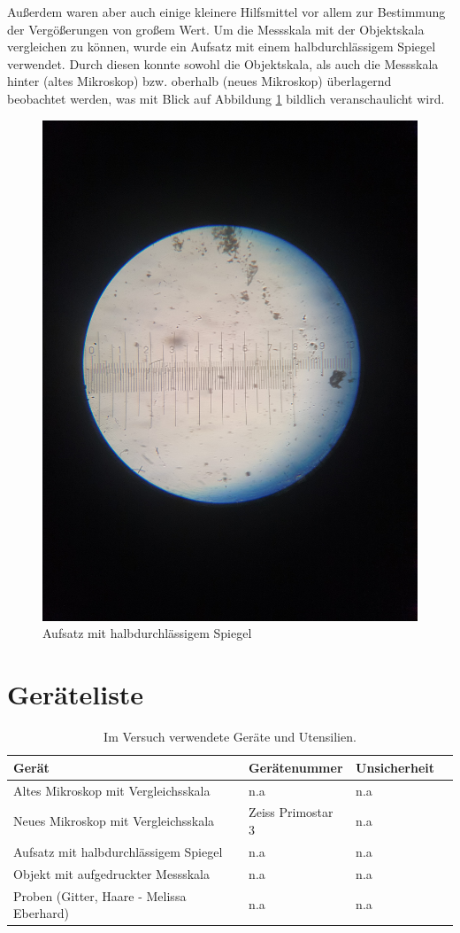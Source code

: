 \documentclass[12pt,a4paper,twoside]{article}
\begin{document}
    \noindent
    Außerdem waren aber auch einige kleinere Hilfsmittel vor allem zur Bestimmung der Vergößerungen von großem Wert. 
    Um die Messskala mit der Objektskala vergleichen zu können, wurde ein Aufsatz mit einem halbdurchlässigem Spiegel verwendet. 
    Durch diesen konnte sowohl die Objektskala, als auch die Messskala hinter (altes Mikroskop) bzw. oberhalb (neues Mikroskop) überlagernd beobachtet werden, was mit Blick auf Abbildung \ref*{fig:Aufsatz} bildlich veranschaulicht wird.

    \begin{figure}[H]
        \centering
        \includegraphics[width=0.5\linewidth, angle=0]{nudes/Aufsatz.jpg}
        \caption{Aufsatz mit halbdurchlässigem Spiegel}
        \label{fig:Aufsatz}
    \end{figure}        


\section{Geräteliste} %

    \begin{table}[H]
        \centering
        \caption{Im Versuch verwendete Geräte und Utensilien.}
        \label{tab:geraete}
        \begin{tabular}{| l | l | l | l |}
            \hline
            Gerät & Gerätenummer  & Unsicherheit \\
            \hline
            Altes Mikroskop mit Vergleichsskala & {n.a} & {n.a} \\
            Neues Mikroskop mit Vergleichsskala & Zeiss Primostar 3 & {n.a} \\
            Aufsatz mit halbdurchlässigem Spiegel & {n.a} & {n.a} \\
            Objekt mit aufgedruckter Messskala & {n.a} & {n.a} \\
            Proben (Gitter, Haare - Melissa Eberhard) & {n.a} & {n.a} \\
            \hline
        \end{tabular}
    \end{table}
\end{document}
